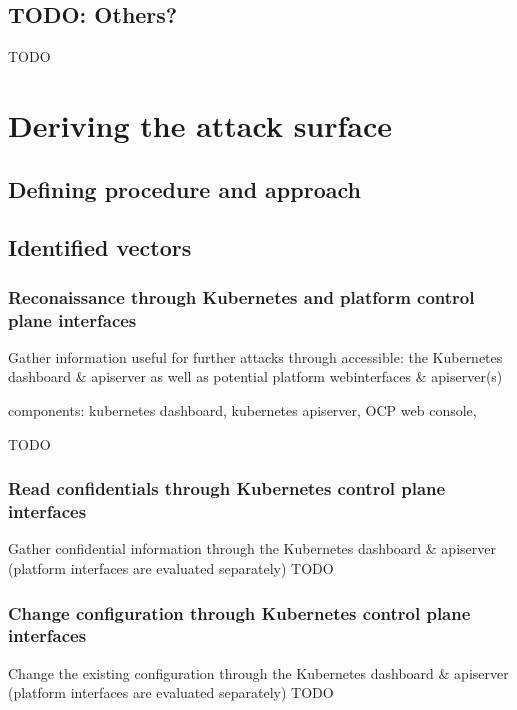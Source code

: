 \section{TODO: Others?}
TODO

\chapter{Deriving the attack surface}

\section{Defining procedure and approach}



\section{Identified vectors}

\subsection{Reconaissance through Kubernetes and platform control plane interfaces}
Gather information useful for further attacks through accessible: the Kubernetes dashboard \& apiserver as well as potential platform webinterfaces \& apiserver(s)

components: kubernetes dashboard, kubernetes apiserver, OCP web console, 

TODO

\subsection{Read confidentials through Kubernetes control plane interfaces}
Gather confidential information through the Kubernetes dashboard \& apiserver (platform interfaces are evaluated separately)
TODO

\subsection{Change configuration through Kubernetes control plane interfaces}
Change the existing configuration through the Kubernetes dashboard \& apiserver (platform interfaces are evaluated separately)
TODO

